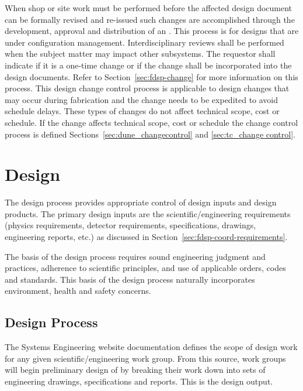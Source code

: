 When shop or site work must be performed before the affected design
document can be formally revised and re-issued such changes are
accomplished through the development, approval and distribution of an
. This process is for designs that are
under configuration management. Interdisciplinary reviews shall be
performed when the  subject matter may impact other
subsystems. The  requestor shall indicate if it is a one-time
change or if the change shall be incorporated into the design
documents. Refer to Section~\ref{sec:fdsp-change} for more information on this
process.  This design change control process is applicable to design
changes that may occur during fabrication and the change needs to be
expedited to avoid schedule delays. These types of changes do not
affect technical scope, cost or schedule. If the change affects
technical scope, cost or schedule the change control process is defined
Sections~\ref{sec:dune_changecontrol} and \ref{sec:tc_change control}.

\section{Design}

The  design process provides appropriate control of design
inputs and design products. The primary design inputs are the
 scientific/engineering requirements (physics
requirements, detector requirements, specifications, drawings,
engineering reports, etc.) as discussed in
Section~\ref{sec:fdsp-coord-requirements}.

The basis of the design process requires sound engineering judgment
and practices, adherence to scientific principles, and use of
applicable orders, codes and standards. This basis of the design
process naturally incorporates environment, health and safety
concerns.

\subsection{Design Process}

The  Systems Engineering website
documentation defines the scope of design work for any given
scientific/engineering work group. From this source, work groups
will begin preliminary design of  by breaking their work
down into sets of engineering drawings, specifications and
reports. This is the design output.

